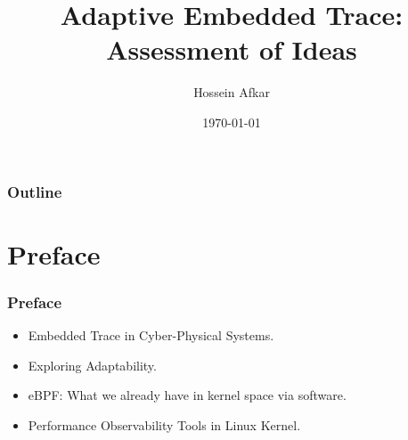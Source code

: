 \documentclass{beamer}
\title[Adaptive Embedded Trace]
{Adaptive Embedded Trace: Assessment of Ideas}
\author[]{Hossein Afkar}
\institute{DRTS Lab}
\date{\today}
\begin{document}
\frame{\titlepage}

\begin{frame}
    \frametitle{Outline}
    \tableofcontents[hideallsubsections]
\end{frame}


\section{Preface}
\begin{frame}
    \frametitle{Preface}
    \begin{itemize}
        \item Embedded Trace in Cyber-Physical Systems.
        \item Exploring Adaptability.
        \item eBPF: What we already have in kernel space via software.
        \item Performance Observability Tools in Linux Kernel.
    \end{itemize}
\end{frame}
\end{document}
